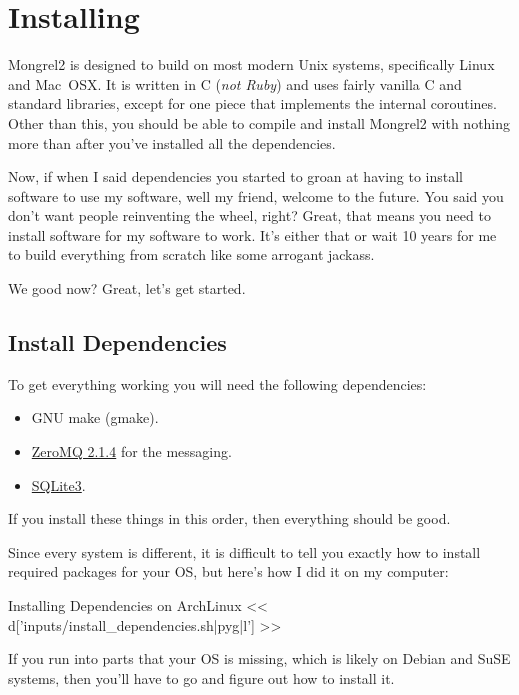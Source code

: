 \chapter{Installing}

Mongrel2 is designed to build on most modern Unix systems, specifically Linux
and Mac~OSX\@.  It is written in C (\emph{not Ruby}) and uses fairly vanilla
C and standard libraries, except for one piece that implements the internal
coroutines.  Other than this, you should be able to compile and install Mongrel2
with nothing more than  after you've installed
all the dependencies.

Now, if when I said dependencies you started to groan at having to install
software to use my software, well my friend, welcome to the future.  You
said you don't want people reinventing the wheel, right?  Great, that means
you need to install software for my software to work.  It's either that or
wait 10 years for me to build everything from scratch like some arrogant
jackass.

We good now?  Great, let's get started.

\section{Install Dependencies}

To get everything working you will need the following dependencies:

\begin{itemize}
\item GNU make (gmake).
\item \href{http://zeromq.org}{ZeroMQ 2.1.4} for the messaging.
\item \href{http://www.sqlite.org/}{SQLite3}.
\end{itemize}

If you install these things in this order, then everything should be good.

Since every system is different, it is difficult to tell you exactly how to
install required packages for your OS, but here's how I did it on my computer:

\begin{code}{Installing Dependencies on ArchLinux}
<< d['inputs/install_dependencies.sh|pyg|l'] >>
\end{code}

If you run into parts that your OS is missing, which is likely on
Debian and SuSE systems, then you'll have to go and figure out
how to install it.

